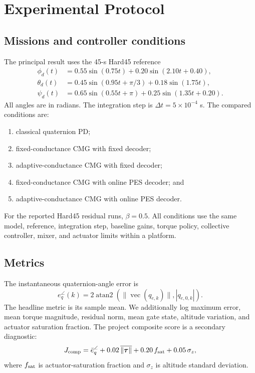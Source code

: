 \documentclass[10pt,twocolumn]{article}
\begin{document}
\section{Experimental Protocol}

\subsection{Missions and controller conditions}

The principal result uses the 45-s Hard45 reference
\begin{align}
\phi_d(t)&=0.55\sin(0.75t)+0.20\sin(2.10t+0.40),\\
\theta_d(t)&=0.45\sin(0.95t+\pi/3)+0.18\sin(1.75t),\\
\psi_d(t)&=0.65\sin(0.55t+\pi)+0.25\sin(1.35t+0.20).
\end{align}
All angles are in radians. The integration step is $\Delta t=5\times10^{-4}$ s.
The compared conditions are:
\begin{enumerate}
    \item classical quaternion PD;
    \item fixed-conductance CMG with fixed decoder;
    \item adaptive-conductance CMG with fixed decoder;
    \item fixed-conductance CMG with online PES decoder; and
    \item adaptive-conductance CMG with online PES decoder.
\end{enumerate}
For the reported Hard45 residual runs, $\beta=0.5$. All conditions use the same
model, reference, integration step, baseline gains, torque policy, collective
controller, mixer, and actuator limits within a platform.

\subsection{Metrics}

The instantaneous quaternion-angle error is
\begin{equation}
    e_q^{\angle}(k)=2\operatorname{atan2}(\|\operatorname{vec}(q_{e,k})\|,
    |q_{e,0,k}|).
\end{equation}
The headline metric is its sample mean. We additionally log maximum error,
mean torque magnitude, residual norm, mean gate state, altitude variation, and
actuator saturation fraction. The project composite score is a secondary
diagnostic:
\begin{equation}
J_{\rm comp}=\bar e_q^{\angle}+0.02\,\overline{\|\bm\tau\|}
+0.20\,f_{\rm sat}+0.05\,\sigma_z,
\end{equation}
where $f_{\rm sat}$ is actuator-saturation fraction and $\sigma_z$ is altitude
standard deviation.
\end{document}
